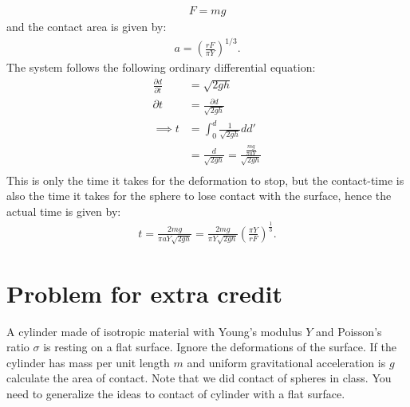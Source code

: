 \documentclass{article}
\begin{document}
\begin{align*}
    F = mg
\end{align*}and the contact area is given by:
\begin{align*}
    a = \left(\frac{rF}{\pi Y}\right)^{1/3}.
\end{align*}
The system follows the following ordinary differential equation:
\begin{align*}
    \frac{\partial d}{\partial t} &= \sqrt{2gh}\\
    \partial t&=\frac{\partial d}{\sqrt{2gh}}\\
    \implies t &= \int_0^d\frac{1}{\sqrt{2gh}}dd'\\
    &= \frac{d}{\sqrt{2gh}} = \frac{\frac{mg}{\pi aY}}{\sqrt{2gh}}\\
\end{align*}This is only the time it takes for the deformation to stop, but the contact-time is also the time it takes for the sphere to lose contact with the surface, hence the actual time is given by:
\begin{align*}
    t = \frac{2mg}{\pi aY\sqrt{2gh}} = \frac{2mg}{\pi Y\sqrt{2gh}}\left(\frac{\pi Y}{r F}\right)^{\frac{1}{3}}.
\end{align*}

\section*{Problem for extra credit}
A cylinder made of isotropic material with Young's modulus $Y$ and Poisson's ratio $\sigma$ is resting on a flat surface. Ignore the deformations of the surface.
If the cylinder has mass per unit length $m$ and uniform gravitational acceleration is $g$ calculate the area of contact. Note that we did contact of spheres in class. You need to generalize the ideas to contact of cylinder with a flat surface.
\end{document}
